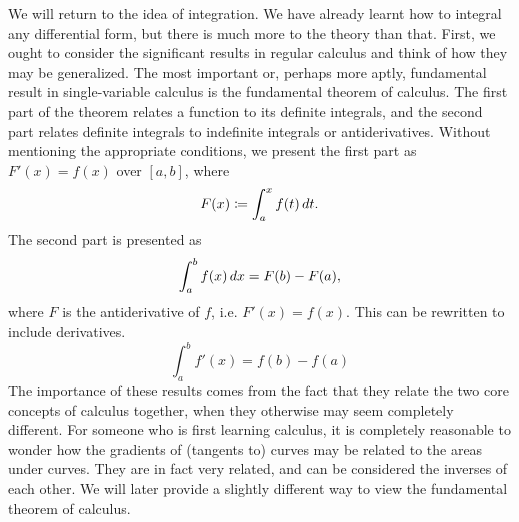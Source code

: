 \documentclass[a4paper,12pt]{article}
\begin{document}
We will return to the idea of integration.
We have already learnt how to integral any differential form, but there is much more to the theory than that.
First, we ought to consider the significant results in regular calculus and think of how they may be generalized.
The most important or, perhaps more aptly, fundamental result in single-variable calculus is the fundamental theorem of calculus.
The first part of the theorem relates a function to its definite integrals, and the second part relates definite integrals to indefinite integrals or antiderivatives.
Without mentioning the appropriate conditions, we present the first part as $F'(x) = f(x)$ over $[a, b]$, where
\begin{equation*}
    F(x) \coloneq \int_a^x f(t) \mathop{}\!d t.
\end{equation*}
The second part is presented as
\begin{equation*}
    \int_a^b f(x) \mathop{}\!d x = F(b) - F(a),
\end{equation*}
where $F$ is the antiderivative of $f$, i.e. $F'(x) = f(x)$.
This can be rewritten to include derivatives.
\begin{equation*}
    \int_a^b f'(x) = f(b) - f(a)
\end{equation*}
The importance of these results comes from the fact that they relate the two core concepts of calculus together, when they otherwise may seem completely different.
For someone who is first learning calculus, it is completely reasonable to wonder how the gradients of (tangents to) curves may be related to the areas under curves.
They are in fact very related, and can be considered the inverses of each other.
We will later provide a slightly different way to view the fundamental theorem of calculus.
\end{document}
